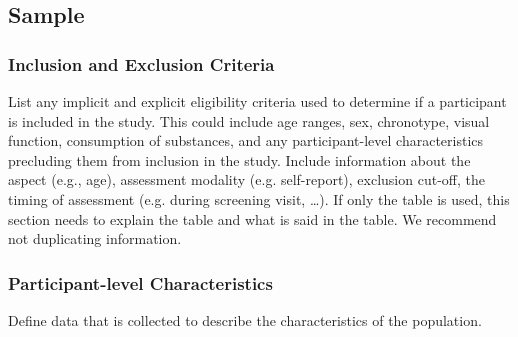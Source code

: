 \subsection{Sample}

\subsubsection{Inclusion and Exclusion Criteria}
\begin{prereg}
\begin{instruction}
List any implicit and explicit eligibility criteria used to determine if a participant is included in the study. This could include age ranges, sex, chronotype, visual function, consumption of substances, and any participant-level characteristics precluding them from inclusion in the study. Include information about the aspect (e.g., age), assessment modality (e.g. self-report), exclusion cut-off, the timing of assessment (e.g. during screening visit, …). If only the table is used, this section needs to explain the table and what is said in the table. We recommend not duplicating information.
\end{instruction}
\end{prereg}



\subsubsection{Participant-level Characteristics}
\begin{prereg}
\begin{instruction}
Define data that is collected to describe the characteristics of the population.
\end{instruction}
\end{prereg}

